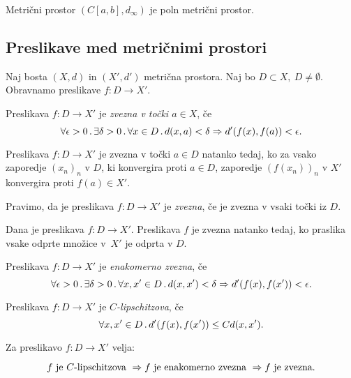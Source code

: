\begin{izrek}
    Metrični prostor $(C[a,b], d_\infty)$ je poln metrični prostor.
\end{izrek}

\subsection{Preslikave med metričnimi prostori}
Naj bosta $(X, d)$ in $(X', d')$ metrična prostora. Naj bo $D \subset X, \ D \neq \emptyset$. Obravnamo preslikave $f: D \to X'$.

\begin{definicija}
    Preslikava $f: D \to X'$ je \emph{zvezna v točki $a \in X$}, če
    $$\forall \epsilon > 0 \,.\, \exists \delta > 0 \,.\, \forall x \in D \,.\, d(x, a) < \delta \Rightarrow d'(f(x), f(a)) < \epsilon.$$
\end{definicija}

\begin{izrek}
    Preslikava $f: D \to X'$ je zvezna v točki $a \in D$ natanko tedaj, ko za vsako zaporedje $(x_n)_n$ v $D$, ki konvergira proti $a \in D$, zaporedje $(f(x_n))_n$ v $X'$ konvergira proti $f(a) \in X'$. 
\end{izrek}

\begin{definicija}
    Pravimo, da je preslikava $f: D \to X'$ je \emph{zvezna}, če je zvezna v vsaki točki iz $D$.
\end{definicija}

\begin{izrek}
    Dana je preslikava $f: D \to X'$. Preslikava $f$ je zvezna natanko tedaj, ko praslika vsake odprte množice v~$X'$ je odprta v $D$.
\end{izrek}

\begin{definicija}
    Preslikava $f: D \to X'$ je \emph{enakomerno zvezna}, če
    $$\forall \epsilon > 0 \,.\, \exists \delta > 0 \,.\, \forall x, x' \in D \,.\, d(x, x') < \delta \Rightarrow d'(f(x), f(x')) < \epsilon.$$
\end{definicija}

\begin{definicija}
    Preslikava $f: D \to X'$ je \emph{$C$-lipschitzova}, če
    $$\forall x, x' \in D \,.\, d'(f(x), f(x')) \leq Cd(x, x').$$
\end{definicija}

\begin{trditev}
    Za preslikavo $f: D \to X'$ velja:

    $$f \text{ je $C$-lipschitzova } \Rightarrow f \text{ je enakomerno zvezna } \Rightarrow f \text{ je zvezna}.$$
\end{trditev}